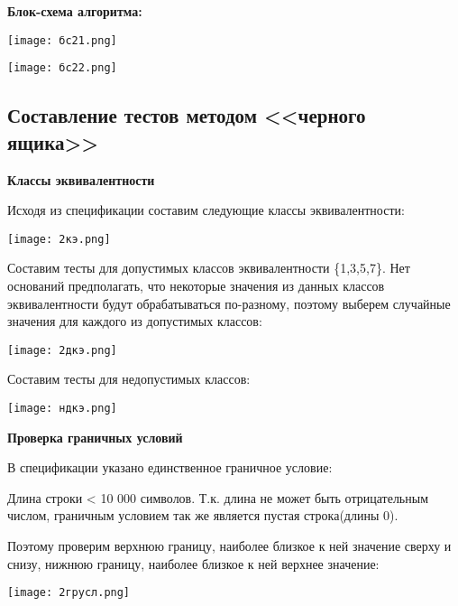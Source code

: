 \documentclass[12pt]{article}
\begin{document}
{\bf Блок-схема алгоритма:}

\vskip 1cm
{
    \centering
    \texttt{[image: бс21.png]}
   
    \label{fig:i1}
}
\vskip 1cm


\vskip 1cm
{
    \centering
    \texttt{[image: бс22.png]}
   
    \label{fig:i1}
}
\vskip 1cm






\subsection{Составление тестов методом <<черного ящика>>}

{\bf Классы эквивалентности}

Исходя из спецификации составим следующие классы эквивалентности:

\vskip 1cm
{
    \centering
    \texttt{[image: 2кэ.png]}
   
    \label{fig:i1}
}
\vskip 1cm


Составим тесты для допустимых классов эквивалентности \{1,3,5,7\}. Нет оснований предполагать, что некоторые значения из данных классов эквивалентности будут обрабатываться по-разному, поэтому выберем случайные значения для каждого из допустимых классов:

\vskip 1cm
{
    \centering
    \texttt{[image: 2дкэ.png]}
   
    \label{fig:i1}
}
\vskip 1cm


Составим тесты для недопустимых классов:

\vskip 1cm
{
    \centering
    \texttt{[image: ндкэ.png]}
   
    \label{fig:i1}
}
\vskip 1cm


{\bf Проверка граничных условий}


В спецификации указано единственное граничное условие:

Длина строки < 10 000 символов.
Т.к. длина не может быть отрицательным числом, граничным условием так же является пустая строка(длины 0).

Поэтому проверим верхнюю границу, наиболее близкое к ней значение сверху и снизу, нижнюю границу, наиболее близкое к ней верхнее значение:

\vskip 1cm
{
    \centering
    \texttt{[image: 2грусл.png]}
   
    \label{fig:i1}
}
\vskip 1cm
\end{document}
